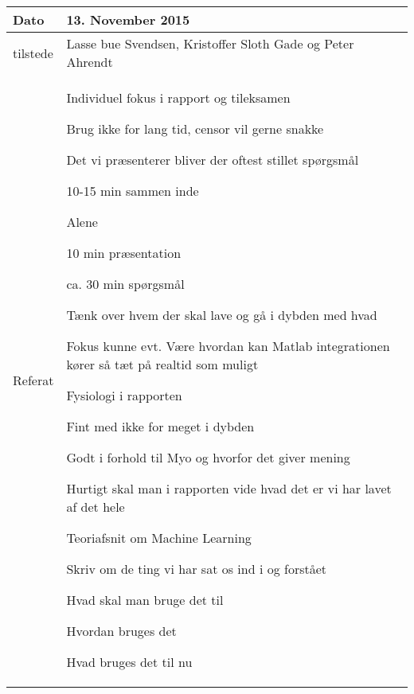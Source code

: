 \begin{center}
	\begin{tabular}{| l | p{10cm} |}
		\hline
		Dato		& 13. November 2015\\ \hline
		tilstede 	& Lasse bue Svendsen, Kristoffer Sloth Gade og Peter Ahrendt\\ \hline
		Referat		& \vspace{-5mm}\begin{myEnumerate}
			\item Individuel fokus i rapport og tileksamen
			\begin{myItemize}				
				\item Brug ikke for lang tid, censor vil gerne snakke
				\item Det vi præsenterer bliver der oftest stillet spørgsmål
				\item 10-15 min sammen inde
				\item Alene
				\begin{myItemize}
					\item 10 min præsentation
					\item ca. 30 min spørgsmål
				\end{myItemize}
				\item Tænk over hvem der skal lave og gå i dybden med hvad
				\item Fokus kunne evt. Være hvordan kan Matlab integrationen kører så tæt på realtid som muligt
			\end{myItemize}
			\item Fysiologi i rapporten
			\begin{myItemize}
				\item Fint med ikke for meget i dybden
				\item Godt i forhold til Myo og hvorfor det giver mening
				\item Hurtigt skal man i rapporten vide hvad det er vi har lavet af det hele
			\end{myItemize}
			\item Teoriafsnit om Machine Learning
			\begin{myItemize}
				\item Skriv om de ting vi har sat os ind i og forstået
				\begin{myItemize}
					\item Hvad skal man bruge det til
					\item Hvordan bruges det
					\item Hvad bruges det til nu
				\end{myItemize}
			\end{myItemize}
		\end{myEnumerate}\\ 	
		\hline
	\end{tabular}
\end{center}

